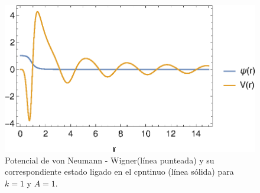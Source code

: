 \begin{figure}
	\begin{center}
		\includegraphics[scale=0.6]{vNW-Figure.eps}
	\end{center}
	\caption{\label{vNW-Figure} \footnotesize Potencial de von Neumann - Wigner(línea punteada) y su correspondiente estado ligado en el cpntinuo (línea sólida) para $k=1$ y $A=1$.}
\end{figure}



